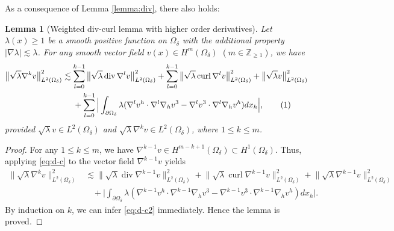 \documentclass[10pt,reqno]{amsart}
\numberwithin{equation}{section}
\newtheorem{lemma}[theorem]{Lemma}
\begin{document}
As a consequence of Lemma \ref{lemma:div}, there also holds:
 \begin{lemma}[Weighted div-curl lemma with higher order derivatives]\label{lemma:divcurl}
	Let $\lambda(x)\geqslant 1$ 
be a smooth positive function on $\Omega_\delta$ with the additional property $|\nabla\lambda|\lesssim \lambda$. For any smooth vector field $v(x)\in H^m(\Omega_\delta)$ $(m\in \mathbb{Z}_{\geqslant 1})$, we have 
\begin{align*}
	\big\|\sqrt\lambda\nabla^k v\big\|_{L^2(\Omega_\delta)}^2 &\lesssim\sum_{l=0}^{k-1}\big\|\sqrt\lambda\operatorname{div }\nabla^lv\big\|_{L^2(\Omega_\delta)}^2+\sum_{l=0}^{k-1} \big\|\sqrt{\lambda}\operatorname{curl }\nabla^lv\big\|_{L^2(\Omega_\delta)}^2+ \big\|\sqrt\lambda v\big\|_{L^2(\Omega_\delta)}^2\\
	&\ \ \ \ +\sum_{l=0}^{k-1}\Big|\int_{\partial\Omega_\delta} \lambda (\nabla^{l}v^h\cdot\nabla^{l}\nabla_h v^3-\nabla^{l}v^3\cdot\nabla^{l}\nabla_hv^h)dx_h\Big|,\stepcounter{equation}\tag{\theequation}\label{eq:d-c2}
\end{align*}
provided $\sqrt{\lambda}v\in L^2(\Omega_\delta)$ and $\sqrt{\lambda}\nabla^k v\in L^2(\Omega_\delta)$, where $1\leqslant k\leqslant m$. 
 \end{lemma}
 
 \begin{proof}
For any $1\leqslant k\leqslant m$, we have
$\nabla^{k-1}v\in H^{m-k+1}(\Omega_{\delta})\subset H^1(\Omega_{\delta})$. Thus, applying \eqref{eq:d-c} to the vector field $\nabla^{k-1}v$ yields
\begin{align*}
\big\|\sqrt\lambda\nabla^k v\big\|_{L^2(\Omega_\delta)}^2 &\lesssim\big\|\sqrt\lambda\operatorname{div }\nabla^{k-1}v\big\|_{L^2(\Omega_\delta)}^2+ \big\|\sqrt\lambda\operatorname{curl }\nabla^{k-1}v\big\|_{L^2(\Omega_\delta)}^2+ \big\|\sqrt\lambda\nabla^{k-1} v\big\|_{L^2(\Omega_\delta)}^2\\
&\ \ \ \ +\Big|\int_{\partial\Omega_\delta} \lambda (\nabla^{k-1}v^h\cdot\nabla^{k-1}\nabla_h v^3-\nabla^{k-1}v^3\cdot\nabla^{k-1}\nabla_hv^h)dx_h\Big|.
\end{align*}
 By induction on $k$, we can infer 
 \eqref{eq:d-c2} immediately. 
Hence the lemma is proved.
 \end{proof}
\end{document}
